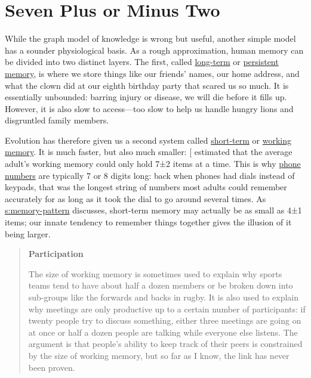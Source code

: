 \section{Seven Plus or Minus Two}\label{s:memory-seven-plus-or-minus}

While the graph model of knowledge is wrong but useful, another simple
model has a sounder physiological basis. As a rough approximation,
human memory can be divided into two distinct layers. The first,
called \protect\hyperlink{g:long-term-memory}{long-term} or \protect\hyperlink{g:persistent-memory}{persistent
memory}, is where we store things like our
friends' names, our home address, and what the clown did at our eighth
birthday party that scared us so much. It is essentially unbounded:
barring injury or disease, we will die before it fills up. However,
it is also slow to access---too slow to help us handle hungry lions
and disgruntled family members.

Evolution has therefore given us a second system called
\protect\hyperlink{g:short-term-memory}{short-term} or \protect\hyperlink{g:working-memory}{working
memory}. It is much faster, but also much smaller:
{[}\protect[\hyperlink{b:Mill1956}{Mill1956}]{]} estimated that the average adult's working memory
could only hold 7±2 items at a time. This is why \href{https://www.quora.com/Why-did-Bell-Labs-create-phone-numbers-of-7-digits-10-digits-Is-there-a-reason-that-dashes-and-brackets-are-used}{phone
numbers} are typically 7 or 8 digits long: back when
phones had dials instead of keypads, that was the longest string of
numbers most adults could remember accurately for as long as it took
the dial to go around several times. As \protect\hyperlink{SECTION}{s:memory-pattern}
discusses, short-term memory may actually be as small as 4±1 items;
our innate tendency to remember things together gives the illusion of
it being larger.

\begin{quote}\setlength{\parindent}{0pt}
\textbf{Participation}

The size of working memory is sometimes used to explain why sports
teams tend to have about half a dozen members or be broken down into
sub-groups like the forwards and backs in rugby. It is also used to
explain why meetings are only productive up to a certain number of
participants: if twenty people try to discuss something, either three
meetings are going on at once or half a dozen people are talking while
everyone else listens. The argument is that people's ability to keep
track of their peers is constrained by the size of working memory, but
so far as I know, the link has never been proven.
\end{quote}

